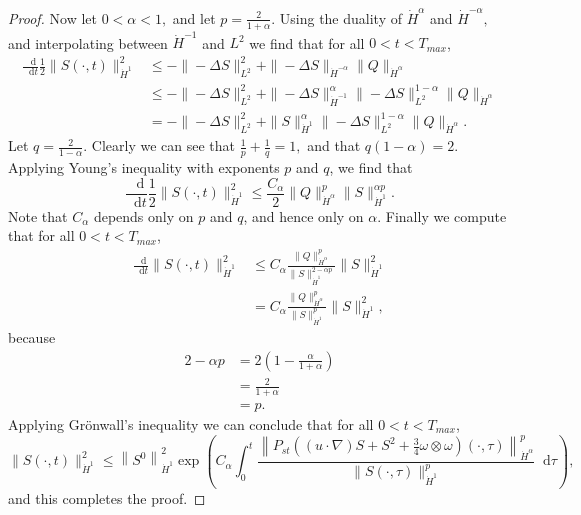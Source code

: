 \documentclass[11pt]{article}
\theoremstyle{plain}
\theoremstyle{remark}
\numberwithin{equation}{section}
\newcommand{\diff}{\mathop{}\!\mathrm{d}}
\begin{document}
\begin{proof}
Now let $0<\alpha<1,$ and let $p=\frac{2}{1+\alpha}$.
Using the duality of $\dot{H}^\alpha$ and $\dot{H}^{-\alpha},$ and interpolating between $\dot{H}^{-1}$ and $L^2$ we find that
for all $0<t<T_{max}$,
\begin{align}
    \frac{\diff}{\diff t}
    \frac{1}{2} \|S(\cdot,t)\|_{\dot{H}^1}^2
    &\leq
    -\|-\Delta S\|_{L^2}^2
    +\|-\Delta S\|_{\dot{H}^{-\alpha}}
    \|Q\|_{\dot{H}^\alpha} \\
    &\leq
    -\|-\Delta S\|_{L^2}^2
    +\|-\Delta S\|_{\dot{H}^{-1}}^\alpha
    \|-\Delta S\|_{L^2}^{1-\alpha}
    \|Q\|_{\dot{H}^\alpha} \\
    &=
    -\|-\Delta S\|_{L^2}^2
    +\|S\|_{\dot{H}^1}^\alpha
    \|-\Delta S\|_{L^2}^{1-\alpha}
    \|Q\|_{\dot{H}^\alpha}.
\end{align}
Let $q=\frac{2}{1-\alpha}$. Clearly we can see that 
$\frac{1}{p}+\frac{1}{q}=1,$ and that $q(1-\alpha)=2$.
Applying Young's inequality with exponents $p$ and $q$,
we find that
\begin{equation}
    \frac{\diff}{\diff t}
    \frac{1}{2} \|S(\cdot,t)\|_{\dot{H}^1}^2
    \leq \frac{C_{\alpha}}{2}
    \|Q\|_{\dot{H}^\alpha}^p
    \|S\|_{\dot{H}^1}^{\alpha p}.
\end{equation}
Note that $C_\alpha$ depends only on $p$ and $q$, 
and hence only on $\alpha$.
Finally we compute that for all $0<t<T_{max}$,
\begin{align}
    \frac{\diff}{\diff t}
    \|S(\cdot,t)\|_{\dot{H}^1}^2
    &\leq
    C_{\alpha}\frac{\|Q\|_{\dot{H}^\alpha}^p}
    {\|S\|_{\dot{H}^1}^{2-\alpha p}}
    \|S\|_{\dot{H}^1}^2 \\
    &=
    C_{\alpha}\frac{\|Q\|_{\dot{H}^\alpha}^p}
    {\|S\|_{\dot{H}^1}^p}
    \|S\|_{\dot{H}^1}^2,
\end{align}
because 
\begin{align}
    2-\alpha p
    &=
    2\left(1-\frac{\alpha}{1+\alpha}\right) \\
    &= \frac{2}{1+\alpha} \\
    &=p.
\end{align}
Applying Gr\"onwall's inequality we can conclude that 
for all $0<t<T_{max}$,
\begin{equation} 
    \|S(\cdot,t)\|_{\dot{H}^1}^2
    \leq
    \left\|S^0 \right\|_{\dot{H}^1}^2
    \exp \left( C_\alpha \int_0^t
    \frac{\left\|P_{st}\left((u\cdot\nabla)S +S^2+\frac{3}{4}\omega\otimes\omega\right)
    (\cdot,\tau)\right\|_{\dot{H}^\alpha}^p}
    {\|S(\cdot,\tau)\|_{\dot{H}^1}^p} 
    \diff\tau \right),
\end{equation}
and this completes the proof.
\end{proof}
\end{document}
